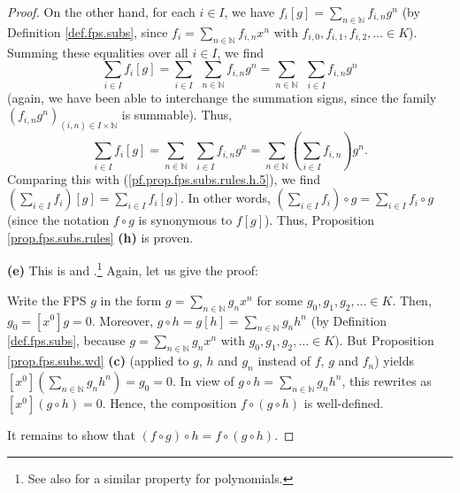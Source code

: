 \begin{proof}
On the other hand, for each $i\in I$, we have $f_{i}\left[  g\right]
=\sum_{n\in\mathbb{N}}f_{i,n}g^{n}$ (by Definition \ref{def.fps.subs}, since
$f_{i}=\sum_{n\in\mathbb{N}}f_{i,n}x^{n}$ with $f_{i,0},f_{i,1},f_{i,2}%
,\ldots\in K$). Summing these equalities over all $i\in I$, we find%
\[
\sum_{i\in I}f_{i}\left[  g\right]  =\sum_{i\in I}\ \ \sum_{n\in\mathbb{N}%
}f_{i,n}g^{n}=\sum_{n\in\mathbb{N}}\ \ \sum_{i\in I}f_{i,n}g^{n}%
\]
(again, we have been able to interchange the summation signs, since the family
$\left(  f_{i,n}g^{n}\right)  _{\left(  i,n\right)  \in I\times\mathbb{N}}$ is
summable). Thus,%
\[
\sum_{i\in I}f_{i}\left[  g\right]  =\sum_{n\in\mathbb{N}}\ \ \sum_{i\in
I}f_{i,n}g^{n}=\sum_{n\in\mathbb{N}}\left(  \sum_{i\in I}f_{i,n}\right)
g^{n}.
\]
Comparing this with (\ref{pf.prop.fps.subs.rules.h.5}), we find $\left(
\sum_{i\in I}f_{i}\right)  \left[  g\right]  =\sum_{i\in I}f_{i}\left[
g\right]  $. In other words, $\left(  \sum_{i\in I}f_{i}\right)  \circ
g=\sum_{i\in I}f_{i}\circ g$ (since the notation $f\circ g$ is synonymous to
$f\left[  g\right]  $). Thus, Proposition \ref{prop.fps.subs.rules}
\textbf{(h)} is proven.

\bigskip

\textbf{(e)} This is \cite[Theorem 7.63]{Loehr-BC} and \cite[Proposition
2.2.5]{Brewer14}.\footnote{See also \cite[Proposition 7.6.14]{19s} for a
similar property for polynomials.} Again, let us give the proof:

Write the FPS $g$ in the form $g=\sum_{n\in\mathbb{N}}g_{n}x^{n}$ for some
$g_{0},g_{1},g_{2},\ldots\in K$. Then, $g_{0}=\left[  x^{0}\right]  g=0$.
Moreover, $g\circ h=g\left[  h\right]  =\sum_{n\in\mathbb{N}}g_{n}h^{n}$ (by
Definition \ref{def.fps.subs}, because $g=\sum_{n\in\mathbb{N}}g_{n}x^{n}$
with $g_{0},g_{1},g_{2},\ldots\in K$). But Proposition \ref{prop.fps.subs.wd}
\textbf{(c)} (applied to $g$, $h$ and $g_{n}$ instead of $f$, $g$ and $f_{n}$)
yields $\left[  x^{0}\right]  \left(  \sum_{n\in\mathbb{N}}g_{n}h^{n}\right)
=g_{0}=0$. In view of $g\circ h=\sum_{n\in\mathbb{N}}g_{n}h^{n}$, this
rewrites as $\left[  x^{0}\right]  \left(  g\circ h\right)  =0$. Hence, the
composition $f\circ\left(  g\circ h\right)  $ is well-defined.

It remains to show that $\left(  f\circ g\right)  \circ h=f\circ\left(  g\circ
h\right)  $.


\end{proof}
